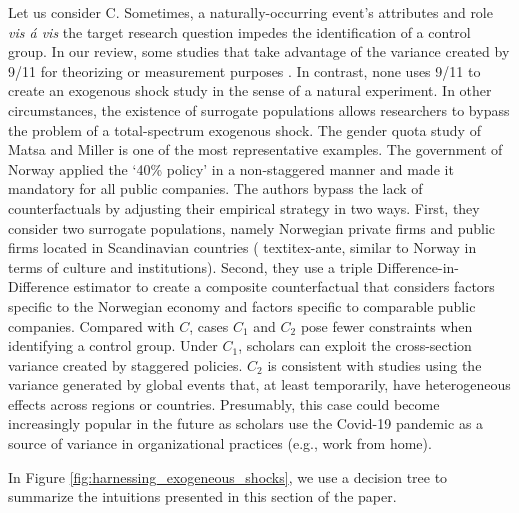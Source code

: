 \begin{refsection}
Let us consider C. Sometimes, a naturally-occurring event's attributes and role 
\textit{vis \'a vis} the target research question impedes the identification
of a control group. In our review, some studies that
take advantage of the variance created by 9/11 for theorizing
\autocite{corbo2016323} or measurement purposes \autocite{vergne20121027}. 
In contrast, none uses 9/11 to create an exogenous shock study in the sense 
of a natural experiment. In other circumstances, the existence of surrogate 
populations allows researchers to bypass the problem of a total-spectrum 
exogenous shock. The gender quota study of Matsa and Miller 
\autocite*{matsa_miller_2013} is one of the most representative examples. 
The government of Norway applied the `40\% policy' in a non-staggered manner 
and made it mandatory for all public companies. The authors bypass
the lack of counterfactuals by adjusting their empirical strategy 
in two ways. First, they consider two surrogate populations, namely Norwegian
private firms and public firms located in Scandinavian countries (
textit{ex-ante}, similar to Norway in terms of culture and institutions). Second, they use 
a triple Difference-in-Difference estimator to create a composite counterfactual
that considers factors specific to the Norwegian 
economy and factors specific to comparable public companies. Compared with $C$,
cases $C_{1}$ and $C_{2}$ pose fewer constraints when identifying a 
control group. Under $C_{1}$, scholars can exploit the cross-section  
variance created by staggered policies. $C_{2}$ is consistent with studies 
using the variance generated by global events that, at least temporarily,
have heterogeneous effects across regions or countries.
Presumably, this case could become increasingly popular in the future 
as scholars use the Covid-19 pandemic as a source of variance in 
organizational practices (e.g., work from home).

In Figure \ref{fig:harnessing_exogeneous_shocks}, we use a decision tree to 
summarize the intuitions presented in this section of the paper. 


\end{refsection}
